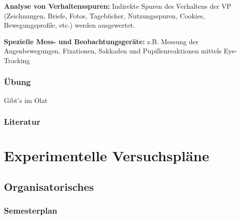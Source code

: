 \documentclass[
]{book}
\begin{document}
\textbf{Analyse von Verhaltensspuren:} Indirekte Spuren des Verhaltens der VP (Zeichnungen, Briefe, Fotos,
Tagebücher, Nutzungsspuren, Cookies, Bewegungsprofile, etc.) werden ausgewertet.

\textbf{Spezielle Mess- und Beobachtungsgeräte:} z.B. Messung der Augenbewegungen, Fixationen,
Sakkaden und Pupillenreaktionen mittels Eye-Tracking

\hypertarget{uxfcbung}{%
\subsection{Übung}\label{uxfcbung}}

Gibt's im Olat

\hypertarget{literatur-1}{%
\subsection{Literatur}\label{literatur-1}}

\hypertarget{experimentelle-versuchspluxe4ne}{%
\chapter{Experimentelle Versuchspläne}\label{experimentelle-versuchspluxe4ne}}

\hypertarget{organisatorisches-5}{%
\section{Organisatorisches}\label{organisatorisches-5}}

\hypertarget{semesterplan-6}{%
\subsection{Semesterplan}\label{semesterplan-6}}
\end{document}
